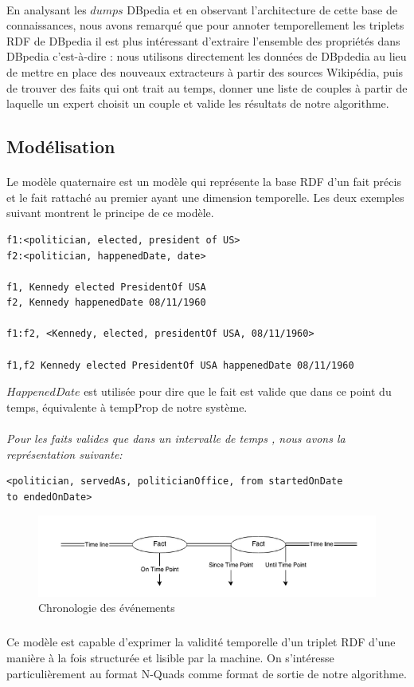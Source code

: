 \paragraph{}
En analysant les $dumps$ DBpedia et en observant l'architecture de cette base de connaissances, nous avons remarqué que pour annoter temporellement les triplets RDF de DBpedia il est plus intéressant d'extraire l'ensemble des propriétés dans DBpedia c'est-à-dire : nous utilisons directement les données de DBpdedia au lieu de mettre en place des nouveaux extracteurs à partir des sources Wikipédia, puis de trouver des faits qui ont trait au temps, donner une liste de couples à partir de laquelle un expert choisit un couple et valide les résultats de notre algorithme.
\subsection{Modélisation}
\paragraph{}
Le modèle quaternaire est un modèle qui représente la base RDF d'un fait précis et le fait rattaché au premier ayant une dimension temporelle. Les deux exemples suivant montrent le principe de ce modèle.
\begin{verbatim}
f1:<politician, elected, president of US>
f2:<politician, happenedDate, date>

f1, Kennedy elected PresidentOf USA 
f2, Kennedy happenedDate 08/11/1960

f1:f2, <Kennedy, elected, presidentOf USA, 08/11/1960>

f1,f2 Kennedy elected PresidentOf USA happenedDate 08/11/1960
\end{verbatim}
$HappenedDate$ est utilisée pour dire que le fait est valide que dans ce point du temps, équivalente à tempProp de notre système.
\paragraph{}
{\it Pour les faits valides que dans un intervalle de temps , nous avons la représentation suivante:}
\begin{verbatim}
<politician, servedAs, politicianOffice, from startedOnDate 
to endedOnDate>
\end{verbatim}
\begin{figure}[H]
        \centering
                \centering
                \includegraphics[width=13cm]{timeline.png}
               \caption{Chronologie des événements}

\end{figure}
\subparagraph{}
Ce modèle est capable d'exprimer la validité temporelle d’un triplet RDF d’une manière à la fois structurée et lisible par la machine. On s'intéresse particulièrement au format N-Quads comme format de sortie de notre algorithme.
